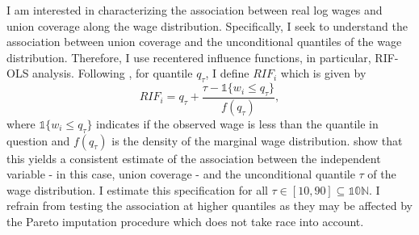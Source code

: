 \documentclass[11pt]{article}
\begin{document}
I am interested in characterizing the association between real log wages and union coverage along the wage distribution. Specifically, I seek to understand the association between union coverage and the unconditional quantiles of the wage distribution. Therefore, I use recentered influence functions, in particular, RIF-OLS analysis. Following \citet{ffl2009}, for quantile $q_\tau$, I define $RIF_i$ which is given by 
\begin{equation}\label{eq:rif}
    RIF_i = q_\tau + \frac{\tau - \mathbb{1}\{w_i \leq q_\tau\}}{f(q_\tau)},
\end{equation}
where $\mathbb{1}\{w_i \leq q_\tau\}$ indicates if the observed wage is less than the quantile in question and $f(q_\tau)$ is the density of the marginal wage distribution. \citet{ffl2009} show that this yields a consistent estimate of the association between the independent variable - in this case, union coverage - and the unconditional quantile $\tau$ of the wage distribution. I estimate this specification for all $\tau \in [10,90]\subseteq \mathbb{10N}$. I refrain from testing the association at higher quantiles as they may be affected by the Pareto imputation procedure which does not take race into account. 
\end{document}
